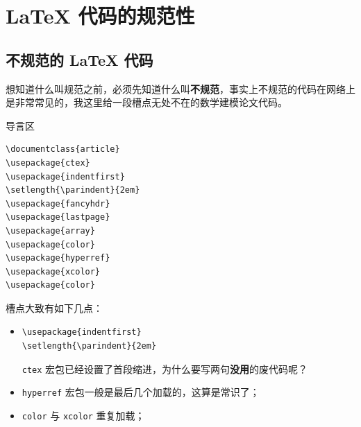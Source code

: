 \documentclass[aspectratio=169,fontset=none]{ctexbeamer}
\renewcommand{\emph}[1]{{\color{red}\bfseries #1}}
\newcommand{\pkg}[1]{\texttt{#1}}
\begin{document}
  \section{\texorpdfstring{\LaTeX{}}{LaTeX} 代码的规范性}
  \subsection{不规范的 \texorpdfstring{\LaTeX{}}{LaTeX} 代码}
  \begin{frame}
    想知道什么叫规范之前，必须先知道什么叫\emph{不规范}，事实上不规范的代码在网络上是非常常见的，我这里给一段槽点无处不在的数学建模论文代码。
  \end{frame}

  \begin{frame}[fragile]{导言区}
    \begin{minipage}[t]{0.5\textwidth}
      \begin{verbatim}
\documentclass{article}
\usepackage{ctex}
\usepackage{indentfirst}
\setlength{\parindent}{2em}
\usepackage{fancyhdr}
\usepackage{lastpage}
\usepackage{array}
\usepackage{color}
\usepackage{hyperref}
\usepackage{xcolor}
\usepackage{color}
      \end{verbatim}
    \end{minipage}%
    \begin{minipage}[t]{0.5\textwidth}
      槽点大致有如下几点：
      \begin{itemize}
        \item \begin{verbatim}
\usepackage{indentfirst}
\setlength{\parindent}{2em}
        \end{verbatim}
        \pkg{ctex} 宏包已经设置了首段缩进，为什么要写两句\emph{没用}的废代码呢？
        \item \pkg{hyperref} 宏包一般是最后几个加载的，这算是常识了；
        \item \pkg{color} 与 \pkg{xcolor} 重复加载；
      \end{itemize}
    \end{minipage}
  \end{frame}
\end{document}
